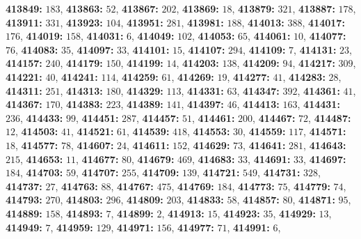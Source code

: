 \textsf{\bfseries 413849:} $183$, \textsf{\bfseries 413863:} $52$, \textsf{\bfseries 413867:} $202$, \textsf{\bfseries 413869:} $18$, \textsf{\bfseries 413879:} $321$, \textsf{\bfseries 413887:} $178$, \textsf{\bfseries 413911:} $331$, \textsf{\bfseries 413923:} $104$, \textsf{\bfseries 413951:} $281$, \textsf{\bfseries 413981:} $188$, \textsf{\bfseries 414013:} $388$, \textsf{\bfseries 414017:} $176$, \textsf{\bfseries 414019:} $158$, \textsf{\bfseries 414031:} $6$, \textsf{\bfseries 414049:} $102$, \textsf{\bfseries 414053:} $65$, \textsf{\bfseries 414061:} $10$, \textsf{\bfseries 414077:} $76$, \textsf{\bfseries 414083:} $35$, \textsf{\bfseries 414097:} $33$, \textsf{\bfseries 414101:} $15$, \textsf{\bfseries 414107:} $294$, \textsf{\bfseries 414109:} $7$, \textsf{\bfseries 414131:} $23$, \textsf{\bfseries 414157:} $240$, \textsf{\bfseries 414179:} $150$, \textsf{\bfseries 414199:} $14$, \textsf{\bfseries 414203:} $138$, \textsf{\bfseries 414209:} $94$, \textsf{\bfseries 414217:} $309$, \textsf{\bfseries 414221:} $40$, \textsf{\bfseries 414241:} $114$, \textsf{\bfseries 414259:} $61$, \textsf{\bfseries 414269:} $19$, \textsf{\bfseries 414277:} $41$, \textsf{\bfseries 414283:} $28$, \textsf{\bfseries 414311:} $251$, \textsf{\bfseries 414313:} $180$, \textsf{\bfseries 414329:} $113$, \textsf{\bfseries 414331:} $63$, \textsf{\bfseries 414347:} $392$, \textsf{\bfseries 414361:} $41$, \textsf{\bfseries 414367:} $170$, \textsf{\bfseries 414383:} $223$, \textsf{\bfseries 414389:} $141$, \textsf{\bfseries 414397:} $46$, \textsf{\bfseries 414413:} $163$, \textsf{\bfseries 414431:} $236$, \textsf{\bfseries 414433:} $99$, \textsf{\bfseries 414451:} $287$, \textsf{\bfseries 414457:} $51$, \textsf{\bfseries 414461:} $200$, \textsf{\bfseries 414467:} $72$, \textsf{\bfseries 414487:} $12$, \textsf{\bfseries 414503:} $41$, \textsf{\bfseries 414521:} $61$, \textsf{\bfseries 414539:} $418$, \textsf{\bfseries 414553:} $30$, \textsf{\bfseries 414559:} $117$, \textsf{\bfseries 414571:} $18$, \textsf{\bfseries 414577:} $78$, \textsf{\bfseries 414607:} $24$, \textsf{\bfseries 414611:} $152$, \textsf{\bfseries 414629:} $73$, \textsf{\bfseries 414641:} $281$, \textsf{\bfseries 414643:} $215$, \textsf{\bfseries 414653:} $11$, \textsf{\bfseries 414677:} $80$, \textsf{\bfseries 414679:} $469$, \textsf{\bfseries 414683:} $33$, \textsf{\bfseries 414691:} $33$, \textsf{\bfseries 414697:} $184$, \textsf{\bfseries 414703:} $59$, \textsf{\bfseries 414707:} $255$, \textsf{\bfseries 414709:} $139$, \textsf{\bfseries 414721:} $549$, \textsf{\bfseries 414731:} $328$, \textsf{\bfseries 414737:} $27$, \textsf{\bfseries 414763:} $88$, \textsf{\bfseries 414767:} $475$, \textsf{\bfseries 414769:} $184$, \textsf{\bfseries 414773:} $75$, \textsf{\bfseries 414779:} $74$, \textsf{\bfseries 414793:} $270$, \textsf{\bfseries 414803:} $296$, \textsf{\bfseries 414809:} $203$, \textsf{\bfseries 414833:} $58$, \textsf{\bfseries 414857:} $80$, \textsf{\bfseries 414871:} $95$, \textsf{\bfseries 414889:} $158$, \textsf{\bfseries 414893:} $7$, \textsf{\bfseries 414899:} $2$, \textsf{\bfseries 414913:} $15$, \textsf{\bfseries 414923:} $35$, \textsf{\bfseries 414929:} $13$, \textsf{\bfseries 414949:} $7$, \textsf{\bfseries 414959:} $129$, \textsf{\bfseries 414971:} $156$, \textsf{\bfseries 414977:} $71$, \textsf{\bfseries 414991:} $6$, 
